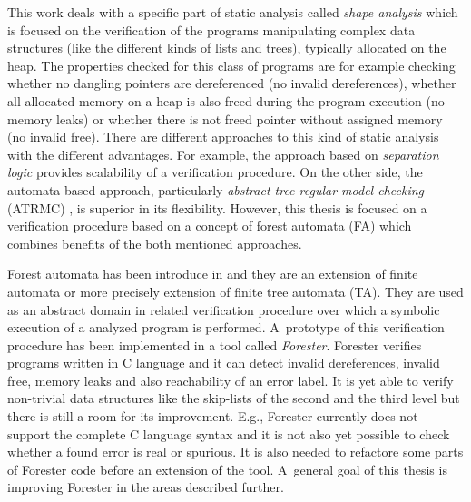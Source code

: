 \documentclass[fleqn,11pt]{ExcelAtFIT} %
\begin{document}
This work deals with a specific part of static analysis called \emph{shape analysis} which is focused on the verification of the programs manipulating
complex data structures (like the different kinds of lists and trees), typically allocated on the heap.
The properties checked for this class of programs are for example checking whether no dangling
pointers are dereferenced (no invalid dereferences), whether all allocated memory on a heap is also freed
during the program execution (no memory leaks) or whether there is not freed pointer without assigned memory (no invalid free).
There are different approaches to this kind of static analysis with the different advantages.
For example, the approach based on \emph{separation logic} \cite{seplog,seplog07} provides scalability of a verification procedure.
On the other side, the automata based approach, particularly \emph{abstract tree regular model checking} (ATRMC) \cite{artmc}, is
superior in its flexibility.
However, this thesis is focused on a verification procedure based on a concept of forest automata (FA) which
combines benefits of the both mentioned approaches.

Forest automata has been introduce in \cite{forester11,forester12} and they are an extension of finite automata or more precisely extension of finite tree automata (TA).
They are used as an abstract domain in related verification procedure over which a symbolic execution of a analyzed program is performed.
A~prototype of this verification procedure has been implemented in a tool called \emph{Forester}.
Forester verifies programs written in C language and it can detect invalid dereferences, invalid free, memory leaks and also reachability of an error label.
It is yet able to verify non-trivial data structures like the skip-lists of the second and the third level
but there is still a room for its improvement.
E.g., Forester currently does not support the complete C language syntax and
it is not also yet possible to check whether a found error is real or spurious.
It is also needed to refactore some parts of Forester code before an extension of the tool.
A~general goal of this thesis is improving Forester in the areas described further.
\end{document}
